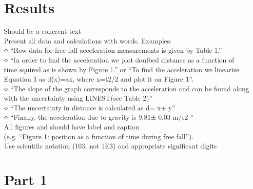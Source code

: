 \documentclass[letterpaper]{article}
\begin{document}
\section{Results}


Should be a coherent text\\
Present all data and calculations with words. Examples:\\
○ “Row data for free-fall acceleration measurements is given by Table 1.”\\
○ “In order to find the acceleration we plot doulbed distance as a function of
time squired as is shown by Figure 1.” or “To find the acceleration we
linearize Equation 1 as d(x)=ax, where x=t2/2 and plot it on Figure 1”.\\
○ “The slope of the graph corresponds to the acceleration and can be found
along with the uncertainty using LINEST(see Table 2)”\\
○ “The uncertainty in distance is calculated as d= x+ y”\\
○ “Finally, the acceleration due to gravity is 9.81± 0.03 m/s2 ”\\
All figures and should have label and caption \\(e.g. “Figure 1: position as a function
of time during free fall”).\\
Use scientific notation (103, not 1E3) and appropriate significant digits

\section{Part 1}
\end{document}
